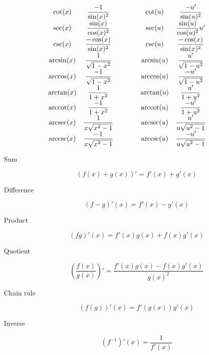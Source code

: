 \begin{tcolorbox}[hbox, title=Basic derivatives]
\begin{minipage}{0.7\textwidth}
\[\begin{array}{ccccc}
  \cot(x)      & \dfrac{-1}{\sin(x)^2}         & \qquad & \cot(u)      & \dfrac{-u'}{\sin(u)^2}\\
  \sec(x)      & \dfrac{\sin(x)}{\cos(x)^2}    & \qquad & \sec(u)      & \dfrac{\sin(u)}{\cos(u)^2}u'\\
  \csc(x)      & \dfrac{-\cos(x)}{\sin(x)^2}   & \qquad & \csc(u)      & \dfrac{-\cos(x)}{\sin(x)^2}\\
  \arcsin(x)   & \dfrac{1}{\sqrt{1-x^2}}       & \qquad & \arcsin(u)   & \dfrac{u'}{\sqrt{1-u^2}}\\
  \arccos(x)   & \dfrac{-1}{\sqrt{1-x^2}}      & \qquad & \arccos(u)   & \dfrac{-u'}{\sqrt{1-u^2}}\\
  \arctan(x)   & \dfrac{1}{1+x^2}              & \qquad & \arctan(u)   & \dfrac{u'}{1+u^2}\\
  \operatorname{arccot}(x)   & \dfrac{-1}{1+x^2}             & \qquad & \operatorname{arccot}(u)   & \dfrac{-u'}{1+u^2}\\
  \operatorname{arcsec}(x)   & \dfrac{1}{x\sqrt{x^2-1}}      & \qquad & \operatorname{arcsec}(u)   & \dfrac{u'}{u\sqrt{u^2-1}}\\
  \operatorname{arccsc}(x)   & \dfrac{-1}{x\sqrt{x^2-1}}     & \qquad & \operatorname{arccsc}(u)   & \dfrac{-u'}{u\sqrt{u^2-1}}  
\end{array}
\]
\end{minipage}
\end{tcolorbox}

\begin{tcolorbox}[hbox, title=Derivative rules]
  \begin{minipage}{0.5\textwidth}
    \begin{description}
      \item[Sum]
      \[
        (f(x)+g(x))' = f'(x) + g'(x)
      \]
      \item[Difference]
      \[
        (f-g)'(x) = f'(x) - g'(x)
      \]
      \item[Product]
      \[
        (fg)'(x) = f'(x)g(x) + f(x)g'(x)
      \]
      \item[Quotient]
      \[
        \left(\frac{f(x)}{g(x)}\right)' = \frac{f'(x)g(x) - f(x)g'(x)}{g(x)^2}
      \]
      \item[Chain rule]
      \[
        (f(g))'(x) = f'(g(x))g'(x)
      \]
      \item[Inverse]
      \[
        (f^{-1})'(x) = \frac{1}{f'(x)}
      \]
    \end{description}
  \end{minipage}
\end{tcolorbox}